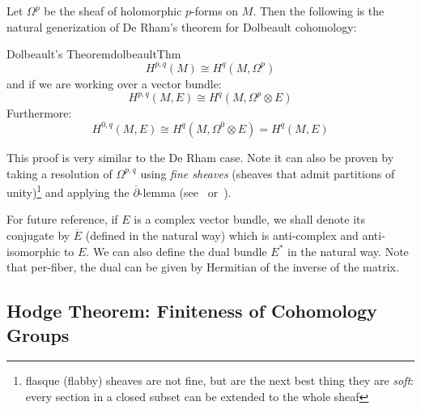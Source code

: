 \documentclass{book}
\newenvironment{Proof}[1][]
  {\begin{ProofTcb}[#1]}
  {\end{ProofTcb}}
\begin{document}
Let $\Omega^p$ be the sheaf of holomorphic $p$-forms on $M$. Then the following is the natural
generization of De Rham's theorem for Dolbeault cohomology:
\begin{thm}{Dolbeault's Theorem}{dolbeaultThm}
  \[
  H^{p,q}(M) \cong H^q(M, \Omega^p)
\]
and if we are working over a vector bundle:
\[
  H^{p,q}(M, E) \cong H^q(M, \Omega^p\otimes E)
\]
Furthermore:
\[
  H^{0,q}(M, E) \cong H^q(M, \Omega^0\otimes E) = H^q(M, E)
\]
\end{thm}

\begin{Proof}
  This proof is very similar to the De Rham case. Note it can also be proven by taking a resolution of
  $\Omega^{p,q}$ using \emph{fine sheaves} (sheaves that admit partitions of unity)\footnote{flasque (flabby) sheaves are
  not fine, but are the next best thing they are \emph{soft}: every section in a closed subset can be extended
  to the whole sheaf} and applying the $\overline{\partial}$-lemma
  (see~\cite{gallierComplexAlgebraicGeometry2011} or~\cite[section~15.4]{hirzebruchTopologicalMethodsAlgebraic1995}).
\end{Proof}

For future reference, if $E$ is a complex vector bundle, we shall denote its conjugate by $\overline{E}$
(defined in the natural way) which is anti-complex and anti-isomorphic to $E$. We can also define the dual
bundle $E^*$ in the natural way. Note that per-fiber, the dual can be given by Hermitian of the inverse of the
matrix.

\subsection*{Hodge Theorem: Finiteness of Cohomology Groups}
\end{document}

